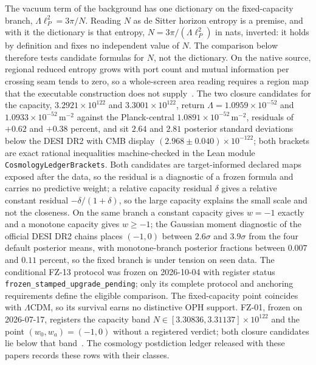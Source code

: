 \documentclass[11pt]{article}
\theoremstyle{remark}
\theoremstyle{plain}
\begin{document}
The vacuum term of the background has one dictionary on the fixed-capacity
branch, \(\Lambda\ell_P^2=3\pi/N\). Reading \(N\) as de Sitter horizon
entropy is a premise, and with it the dictionary is that entropy,
\(N=3\pi/(\Lambda\ell_P^2)\) in nats, inverted: it holds by definition and
fixes no independent value of \(N\). The comparison below therefore tests
candidate formulas for \(N\), not the dictionary. On the native source, regional reduced entropy grows
with port count and mutual information per crossing seam tends to zero, so
a whole-screen area reading requires a region map that the executable
construction does not supply~\cite{ophentropy}. The two closure candidates for the
capacity, \(3.2921\times10^{122}\) and \(3.3001\times10^{122}\), return
\(\Lambda=1.0959\times10^{-52}\) and \(1.0933\times10^{-52}\,\mathrm{m^{-2}}\)
against the Planck-central \(1.0891\times10^{-52}\,\mathrm{m^{-2}}\),
residuals of \(+0.62\) and \(+0.38\) percent, and sit \(2.64\) and
\(2.81\) posterior standard deviations below the DESI DR2 with CMB display
\((2.968\pm0.040)\times10^{-122}\); both brackets are exact rational
inequalities machine-checked in the Lean module
\texttt{CosmologyLedgerBrackets}. Both candidates are target-informed
declared maps exposed after the data, so the residual is a diagnostic
of a frozen formula and carries no predictive weight; a relative capacity
residual \(\delta\) gives a relative constant residual \(-\delta/(1+\delta)\),
so the large capacity explains the small scale and not the closeness. On
the same branch a constant capacity gives \(w=-1\) exactly and a monotone
capacity gives \(w\ge-1\); the Gaussian moment diagnostic of the official
DESI DR2 chains places \((-1,0)\) between \(2.6\sigma\) and \(3.9\sigma\)
from the four default posterior means, with monotone-branch posterior
fractions between \(0.007\) and \(0.11\) percent, so the fixed branch is
under tension on seen data. The conditional FZ-13 protocol was frozen on
2026-10-04 with register status \texttt{frozen\_stamped\_upgrade\_pending};
only its complete protocol and anchoring requirements define the eligible
comparison. The fixed-capacity point coincides with \(\Lambda\)CDM, so its
survival earns no distinctive OPH support. FZ-01, frozen on 2026-07-17,
registers the capacity band \(N\in[3.30836,3.31137]\times10^{122}\) and the
point \((w_0,w_a)=(-1,0)\) without a registered verdict; both closure
candidates lie below that band~\cite{ophladder}. The cosmology postdiction ledger released with
these papers records these rows with their classes.
\end{document}
